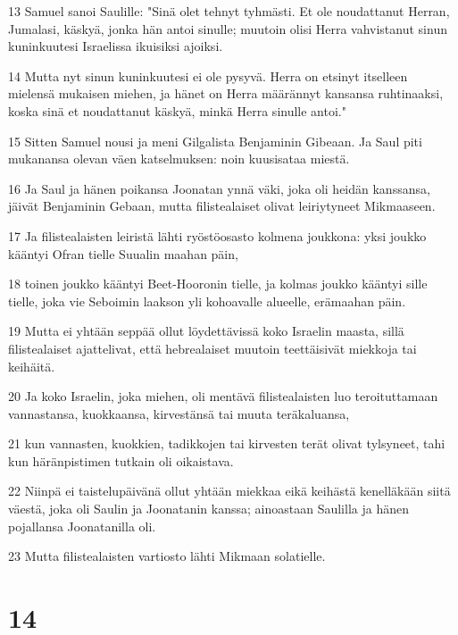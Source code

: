 \par 13 Samuel sanoi Saulille: "Sinä olet tehnyt tyhmästi. Et ole noudattanut Herran, Jumalasi, käskyä, jonka hän antoi sinulle; muutoin olisi Herra vahvistanut sinun kuninkuutesi Israelissa ikuisiksi ajoiksi.
\par 14 Mutta nyt sinun kuninkuutesi ei ole pysyvä. Herra on etsinyt itselleen mielensä mukaisen miehen, ja hänet on Herra määrännyt kansansa ruhtinaaksi, koska sinä et noudattanut käskyä, minkä Herra sinulle antoi."
\par 15 Sitten Samuel nousi ja meni Gilgalista Benjaminin Gibeaan. Ja Saul piti mukanansa olevan väen katselmuksen: noin kuusisataa miestä.
\par 16 Ja Saul ja hänen poikansa Joonatan ynnä väki, joka oli heidän kanssansa, jäivät Benjaminin Gebaan, mutta filistealaiset olivat leiriytyneet Mikmaaseen.
\par 17 Ja filistealaisten leiristä lähti ryöstöosasto kolmena joukkona: yksi joukko kääntyi Ofran tielle Suualin maahan päin,
\par 18 toinen joukko kääntyi Beet-Hooronin tielle, ja kolmas joukko kääntyi sille tielle, joka vie Seboimin laakson yli kohoavalle alueelle, erämaahan päin.
\par 19 Mutta ei yhtään seppää ollut löydettävissä koko Israelin maasta, sillä filistealaiset ajattelivat, että hebrealaiset muutoin teettäisivät miekkoja tai keihäitä.
\par 20 Ja koko Israelin, joka miehen, oli mentävä filistealaisten luo teroituttamaan vannastansa, kuokkaansa, kirvestänsä tai muuta teräkaluansa,
\par 21 kun vannasten, kuokkien, tadikkojen tai kirvesten terät olivat tylsyneet, tahi kun häränpistimen tutkain oli oikaistava.
\par 22 Niinpä ei taistelupäivänä ollut yhtään miekkaa eikä keihästä kenelläkään siitä väestä, joka oli Saulin ja Joonatanin kanssa; ainoastaan Saulilla ja hänen pojallansa Joonatanilla oli.
\par 23 Mutta filistealaisten vartiosto lähti Mikmaan solatielle.

\chapter{14}

